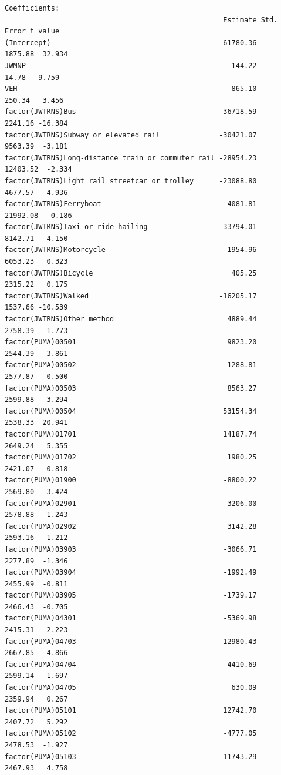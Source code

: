 \documentclass[
  letterpaper,
  DIV=11,
  numbers=noendperiod]{scrartcl}
\begin{document}
\begin{verbatim}
Coefficients:
                                                    Estimate Std. Error t value
(Intercept)                                         61780.36    1875.88  32.934
JWMNP                                                 144.22      14.78   9.759
VEH                                                   865.10     250.34   3.456
factor(JWTRNS)Bus                                  -36718.59    2241.16 -16.384
factor(JWTRNS)Subway or elevated rail              -30421.07    9563.39  -3.181
factor(JWTRNS)Long-distance train or commuter rail -28954.23   12403.52  -2.334
factor(JWTRNS)Light rail streetcar or trolley      -23088.80    4677.57  -4.936
factor(JWTRNS)Ferryboat                             -4081.81   21992.08  -0.186
factor(JWTRNS)Taxi or ride-hailing                 -33794.01    8142.71  -4.150
factor(JWTRNS)Motorcycle                             1954.96    6053.23   0.323
factor(JWTRNS)Bicycle                                 405.25    2315.22   0.175
factor(JWTRNS)Walked                               -16205.17    1537.66 -10.539
factor(JWTRNS)Other method                           4889.44    2758.39   1.773
factor(PUMA)00501                                    9823.20    2544.39   3.861
factor(PUMA)00502                                    1288.81    2577.87   0.500
factor(PUMA)00503                                    8563.27    2599.88   3.294
factor(PUMA)00504                                   53154.34    2538.33  20.941
factor(PUMA)01701                                   14187.74    2649.24   5.355
factor(PUMA)01702                                    1980.25    2421.07   0.818
factor(PUMA)01900                                   -8800.22    2569.80  -3.424
factor(PUMA)02901                                   -3206.00    2578.88  -1.243
factor(PUMA)02902                                    3142.28    2593.16   1.212
factor(PUMA)03903                                   -3066.71    2277.89  -1.346
factor(PUMA)03904                                   -1992.49    2455.99  -0.811
factor(PUMA)03905                                   -1739.17    2466.43  -0.705
factor(PUMA)04301                                   -5369.98    2415.31  -2.223
factor(PUMA)04703                                  -12980.43    2667.85  -4.866
factor(PUMA)04704                                    4410.69    2599.14   1.697
factor(PUMA)04705                                     630.09    2359.94   0.267
factor(PUMA)05101                                   12742.70    2407.72   5.292
factor(PUMA)05102                                   -4777.05    2478.53  -1.927
factor(PUMA)05103                                   11743.29    2467.93   4.758

\end{verbatim}
\end{document}
